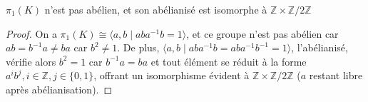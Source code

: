 \begin{proposition}
    $\pi_1(K)$ n'est pas abélien, et son abélianisé est isomorphe à $\mathbb{Z}\times\mathbb{Z}/2\mathbb{Z}$
\end{proposition}
\begin{proof}
    On a $\pi_1(K)\cong\langle a,b\mid aba^{-1}b=1\rangle$, et ce groupe n'est pas abélien car $ab=b^{-1}a\neq ba$ car $b^2\neq 1$. De plus, $\langle a,b\mid aba^{-1}b=aba^{-1}b^{-1}=1\rangle$, l'abélianisé, vérifie alors $b^2=1$ car $b^{-1}a=ba$ et tout élément se réduit à la forme $a^ib^j,i\in\mathbb{Z},j\in\{0,1\}$, offrant un isomorphisme évident à $\mathbb{Z}\times\mathbb{Z}/2\mathbb{Z}$ ($a$ restant libre après abélianisation).  
\end{proof}
